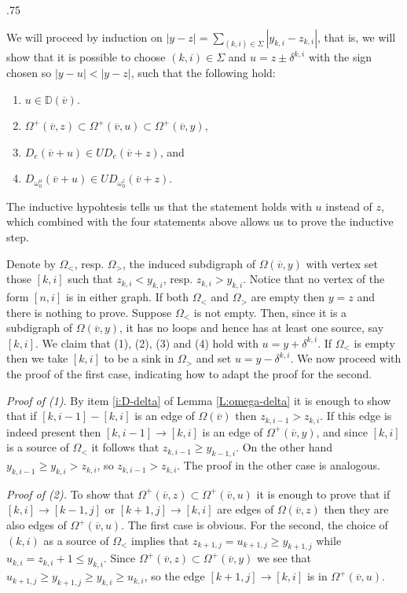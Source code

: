 \documentclass[11pt,fleqn]{amsart}
\makeatletter
\renewcommand\proofname{Proof}
\renewenvironment{proof}[1][\textit{\proofname}]{\par
 \pushQED{\qed}%
 \normalfont \topsep.75\paraskip\relax
 \trivlist
 \item[\hskip\labelsep
 \itshape
 #1\@addpunct{.}]\ignorespaces
}{%
 \popQED\endtrivlist\@endpefalse
}
\newcounter{para}[section]
\renewcommand\to{\rightarrow}
\newcommand\vv{\overline{v}}
\newcommand\DD{\mathbb D}
\makeatother
\begin{document}
\begin{proof}
We will proceed by induction on $|y-z| = \sum_{(k,i) \in \Sigma} |y_{k,i} - 
z_{k,i}|$, that is, we will show that it is possible to choose $(k,i) \in 
\Sigma$ and $u = z \pm \delta^{k,i}$ with the sign chosen so $|y-u|<|y-z|$, 
such that the following hold:
\begin{enumerate}
\item $u \in \DD(\vv)$.

\item $\Omega^+(\vv,z) \subset \Omega^+(\vv,u) \subset \Omega^+(\vv,y)$,

\item $D_{e}(\vv + u) \in U D_{e}(\vv + z)$, and

\item $D_{\omega_0^u}(\vv + u) \in U D_{\omega_0^z}(\vv + z)$.
\end{enumerate}
The inductive hypohtesis tells us that the statement holds with $u$ instead
of $z$, which combined with the four statements above allows us to prove
the inductive step.

Denote by $\Omega_<$, resp. $\Omega_>$, the induced subdigraph of 
$\Omega(\vv,y)$ with vertex set those $[k,i]$ such that $z_{k,i} < y_{k,i}$, 
resp. $z_{k,i} > y_{k,i}$. Notice that no vertex of the form $[n,i]$ is in 
either graph. If both $\Omega_<$ and $\Omega_>$ are empty then 
$y = z$ and there is nothing to prove. Suppose $\Omega_<$ is not empty. Then, 
since it is a subdigraph of $\Omega(\vv,y)$, it has no loops and hence has at 
least one source, say $[k,i]$. We claim that (1), (2), (3) and (4) hold with 
$u = y + \delta^{k,i}$. If $\Omega_<$ is empty then we take $[k,i]$ to be
a sink in $\Omega_>$ and set $u = y - \delta^{k,i}$. We now proceed with the 
proof of the first case, indicating how to adapt the proof for the second.

\emph{Proof of (1)}. By item \ref{i:D-delta} of Lemma \ref{L:omega-delta}
it is enough to show that if $[k,i-1] - [k,i]$ is an edge of $\Omega(\vv)$ 
then $z_{k,i-1} > z_{k,i}$. If this edge is indeed present then $[k,i-1] \to 
[k,i]$ is an edge of $\Omega^+(\vv,y)$, and since $[k,i]$ is a source of 
$\Omega_<$ it follows that $z_{k,i-1} \geq y_{k-1,i}$. On the other hand
$y_{k,i-1} \geq y_{k,i} > z_{k,i}$, so $z_{k,i-1} > z_{k,i}$. The proof in
the other case is analogous.

\emph{Proof of (2).} To show that $\Omega^+(\vv,z) \subset \Omega^+(\vv,u)$ 
it is enough to prove that if $[k,i] \to [k-1,j]$ or $[k+1,j] \to [k,i]$ are 
edges of $\Omega(\vv,z)$ then they are also edges of $\Omega^+(\vv,u)$. The 
first case is obvious. For the second, the choice of $(k,i)$ as a source of 
$\Omega_<$ implies that $z_{k+1,j} = u_{k+1,j} \geq y_{k+1,j}$ while $u_{k,i}
= z_{k,i} + 1 \leq y_{k,i}$. Since $\Omega^+(\vv,z) \subset \Omega^+(\vv,y)$
we see that $u_{k+1,j} \geq y_{k+1,j} \geq y_{k,i} \geq u_{k,i}$, so the edge
$[k+1,j] \to [k,i]$ is in $\Omega^+(\vv,u)$.


\end{proof}
\end{document}
